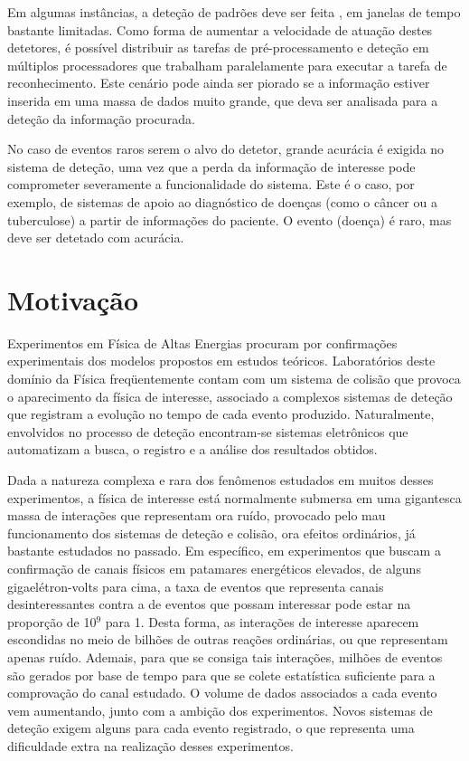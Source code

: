 Em algumas instâncias, a deteção de padrões deve ser feita , em
janelas de tempo bastante limitadas. Como forma de aumentar a velocidade de
atuação destes detetores, é possível distribuir as tarefas de
pré-processamento e deteção em múltiplos processadores que trabalham
paralelamente para executar a tarefa de reconhecimento. Este cenário pode
ainda ser piorado se a informação estiver inserida em uma massa de dados muito
grande, que deva ser analisada para a deteção da informação procurada.

No caso de eventos raros serem o alvo do detetor, grande acurácia é exigida no
sistema de deteção, uma vez que a perda da informação de interesse pode
comprometer severamente a funcionalidade do sistema. Este é o caso, por
exemplo, de sistemas de apoio ao diagnóstico de doenças (como o câncer ou a
tuberculose) a partir de informações do paciente. O evento (doença) é raro,
mas deve ser detetado com acurácia.

\section{Motivação}

Experimentos em Física de Altas Energias procuram por confirmações
experimentais dos modelos propostos em estudos teóricos. Laboratórios deste
domínio da Física freqüentemente contam com um sistema de colisão que provoca
o aparecimento da física de interesse, associado a complexos sistemas de
deteção que registram a evolução no tempo de cada evento
produzido. Naturalmente, envolvidos no processo de deteção encontram-se
sistemas eletrônicos que automatizam a busca, o registro e a análise dos
resultados obtidos.

Dada a natureza complexa e rara dos fenômenos estudados em muitos desses
experimentos, a física de interesse está normalmente submersa em uma
gigantesca massa de interações que representam ora ruído, provocado pelo mau
funcionamento dos sistemas de deteção e colisão, ora efeitos ordinários, já
bastante estudados no passado. Em específico, em experimentos que buscam a
confirmação de canais físicos em patamares energéticos elevados, de alguns
gigaelétron-volts para cima, a taxa de eventos que representa canais
desinteressantes contra a de eventos que possam interessar pode estar na
proporção de 10$^9$ para 1. Desta forma, as interações de interesse aparecem
escondidas no meio de bilhões de outras reações ordinárias, ou que representam
apenas ruído. Ademais, para que se consiga tais interações, milhões de eventos
são gerados por base de tempo para que se colete estatística suficiente para a
comprovação do canal estudado. O volume de dados associados a cada evento vem
aumentando, junto com a ambição dos experimentos. Novos sistemas de deteção
exigem alguns  para cada evento registrado, o que representa
uma dificuldade extra na realização desses experimentos.

